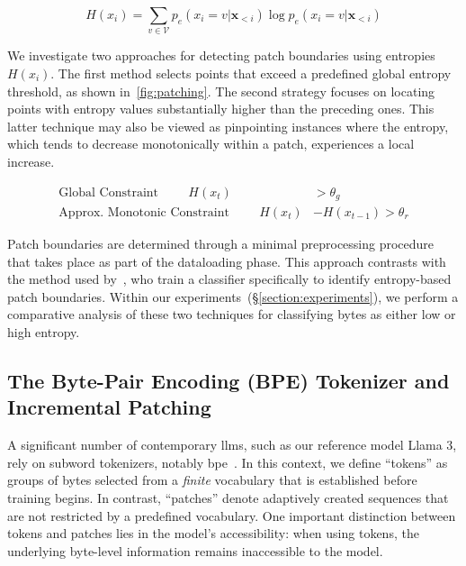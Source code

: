 \begin{equation}
H(x_i) = \sum_{v \in \mathcal{V}} p_{e}(x_i=v|\pmb{x}_{<i}) \log p_{e}(x_i=v|\pmb{x}_{<i})
\end{equation}

We investigate two approaches for detecting patch boundaries using entropies $H(x_i)$. The first method selects points that exceed a predefined global entropy threshold, as shown in~\autoref{fig:patching}. The second strategy focuses on locating points with entropy values substantially higher than the preceding ones. This latter technique may also be viewed as pinpointing instances where the entropy, which tends to decrease monotonically within a patch, experiences a local increase.

\begin{align*}
    \text{Global Constraint}\hspace{1cm}H(x_t)& > \theta_g\\
    \text{Approx. Monotonic Constraint}\hspace{1cm}H(x_t)& - H(x_{t-1}) > \theta_r
\end{align*}

Patch boundaries are determined through a minimal preprocessing procedure that takes place as part of the dataloading phase. This approach contrasts with the method used by~\citet{nawrot-etal-2023-efficient}, who train a classifier specifically to identify entropy-based patch boundaries. Within our experiments~(\S\ref{section:experiments}), we perform a comparative analysis of these two techniques for classifying bytes as either low or high entropy.

\subsection{The Byte-Pair Encoding (BPE) Tokenizer and Incremental Patching}
\label{section:incremental-patching}
\label{section:bpe-patch}

A significant number of contemporary llms, such as our reference model Llama 3, rely on subword tokenizers, notably bpe~\citep{gage1994new, sennrich-etal-2016-neural}. In this context, we define ``tokens'' as groups of bytes selected from a \textit{finite} vocabulary that is established before training begins. In contrast, ``patches'' denote adaptively created sequences that are not restricted by a predefined vocabulary. One important distinction between tokens and patches lies in the model’s accessibility: when using tokens, the underlying byte-level information remains inaccessible to the model.

